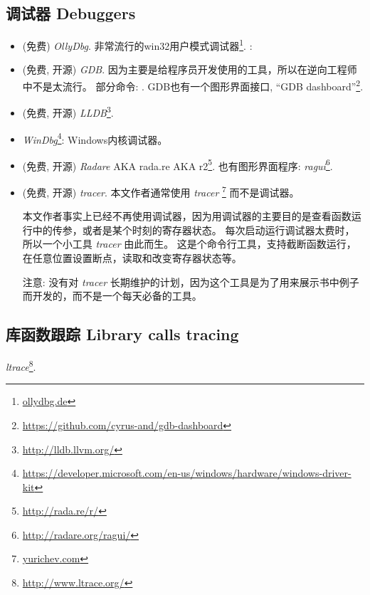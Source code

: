 \documentclass[UTF8,nofonts]{ctexart}
\begin{document}
\subsection{调试器 Debuggers}

\myindex{\olly}

\begin{itemize}
\item (免费) \emph{OllyDbg}.
非常流行的win32用户模式调试器\footnote{\href{http://go.yurichev.com/17032}{ollydbg.de}}.
\ShortHotKeyCheatsheet: 

\item (免费, 开源) \emph{GDB}.
因为主要是给程序员开发使用的工具，所以在逆向工程师中不是太流行。
部分命令: .
GDB也有一个图形界面接口, ``GDB dashboard''\footnote{\url{https://github.com/cyrus-and/gdb-dashboard}}.

\item (免费, 开源) \emph{LLDB}\footnote{\url{http://lldb.llvm.org/}}.

\item \emph{WinDbg}\footnote{\url{https://developer.microsoft.com/en-us/windows/hardware/windows-driver-kit}}:
Windows内核调试器。

\item (免费, 开源) \emph{Radare} \ac{AKA} rada.re \ac{AKA} r2\footnote{\url{http://rada.re/r/}}.
也有图形界面程序: \emph{ragui}\footnote{\url{http://radare.org/ragui/}}.

\item (免费, 开源) \emph{tracer}.
\label{tracer}
本文作者通常使用 \emph{tracer}
\footnote{\href{http://go.yurichev.com/17338}{yurichev.com}}
而不是调试器。

本文作者事实上已经不再使用调试器，因为用调试器的主要目的是查看函数运行中的传参，或者是某个时刻的寄存器状态。
每次启动运行调试器太费时，所以一个小工具 \emph{tracer} 由此而生。
这是个命令行工具，支持截断函数运行，在任意位置设置断点，读取和改变寄存器状态等。

注意: 没有对 \emph{tracer} 长期维护的计划，因为这个工具是为了用来展示书中例子而开发的，而不是一个每天必备的工具。
\end{itemize}

\subsection{库函数跟踪 Library calls tracing}

\emph{ltrace}\footnote{\url{http://www.ltrace.org/}}.
\end{document}
